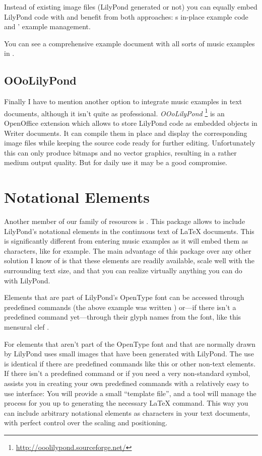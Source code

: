\documentclass[DIV=12]{scrreprt}
\begin{document}
Instead of existing image files (LilyPond generated or not) you can equally embed LilyPond code with  and benefit from both approaches:
s in-place example code and ' example management.

You can see a comprehensive example document with all sorts of music examples in .

\subsection{OOoLilyPond}
\label{subsubsec:pt_ooo-lilypond}
Finally I have to mention another option to integrate music examples in text documents, although it isn't quite as professional.
\emph{OOoLilyPond}%
\footnote{\url{http://ooolilypond.sourceforge.net/}}
is an OpenOffice extension which allows to store LilyPond code as embedded objects in Writer documents.
It can compile them in place and display the corresponding image files while keeping the source code ready for further editing.
Unfortunately this can only produce bitmaps and no vector graphics, resulting in a rather medium output quality. But for daily use it may be a good compromise.

\section{Notational Elements}
\label{sec:pt_notational-elements}
Another member of our family of resources is \lilyglyphs[scale=1.1].
This package allows to include LilyPond's notational elements in the continuous text of \LaTeX{} documents.
This is significantly different from entering music examples as it will embed them as characters, like  for example.
The main advantage of this package over any other solution I know of is that these elements are readily available, scale well with the surrounding text size, and that you can realize virtually anything you can do with LilyPond.

Elements that are part of LilyPond's OpenType font can be accessed through predefined commands (the above example was written ) or---if there isn't a predefined command yet---through their glyph names from the font, like this  mensural clef .

For elements that aren't part of the OpenType font and that are normally drawn by LilyPond \lilyglyphs[scale=1.1] uses small images that have been generated with LilyPond.
The use is identical if there are predefined commands like this \crotchet[scale=1.1]  or other non-text \crescHairpin  elements.
If there isn't a predefined command or if you need a very non-standard symbol, \lilyglyphs[scale=1.1] assists you in creating your own predefined commands with a relatively easy to use interface:
You will provide a small “template file”, and a tool will manage the process for you up to generating the necessary \LaTeX{} command.
This way you can include arbitrary notational elements as characters in your text documents, with perfect control over the scaling and positioning.
\end{document}
